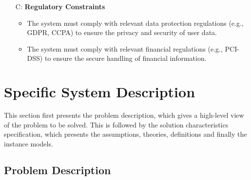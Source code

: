\documentclass[12pt]{article}
\newcounter{constraintnum} %
\begin{document}
\begin{itemize}
  \item [C\refstepcounter{constraintnum}\theconstraintnum :] \textbf{Regulatory Constraints} 
    \begin{itemize} 
      \item The system must comply with relevant data protection regulations (e.g., GDPR, CCPA) to ensure the privacy and security of user data. 
      \item The system must comply with relevant financial regulations (e.g., PCI-DSS) to ensure the secure handling of financial information. 
    \end{itemize}
\end{itemize}


\newpage

\section{Specific System Description}

This section first presents the problem description, which gives a high-level
view of the problem to be solved.  This is followed by the solution characteristics
specification, which presents the assumptions, theories, definitions and finally
the instance models.  

\subsection{Problem Description} \label{Sec_pd}
\end{document}

